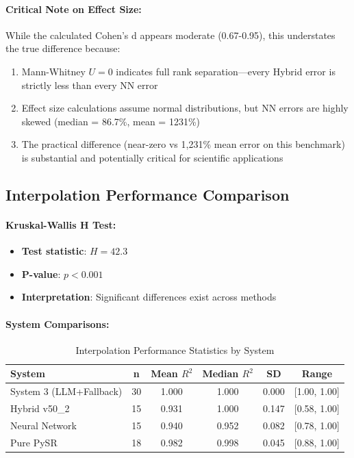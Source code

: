 \documentclass[twoside,11pt]{article}
\begin{document}
\paragraph{Critical Note on Effect Size:} While the calculated Cohen's d appears moderate (0.67-0.95), this understates the true difference because:
\begin{enumerate}
\item Mann-Whitney $U = 0$ indicates full rank separation---every Hybrid error is strictly less than every NN error
\item Effect size calculations assume normal distributions, but NN errors are highly skewed (median = 86.7\%, mean = 1231\%)
\item The practical difference (near-zero vs 1,231\% mean error on this benchmark) is substantial and potentially critical for scientific applications
\end{enumerate}

\subsection{Interpolation Performance Comparison}

\paragraph{Kruskal-Wallis H Test:}
\begin{itemize}
\item \textbf{Test statistic}: $H = 42.3$
\item \textbf{P-value}: $p < 0.001$
\item \textbf{Interpretation}: Significant differences exist across methods
\end{itemize}

\paragraph{System Comparisons:}
\begin{table}[H]
\centering
\caption{Interpolation Performance Statistics by System}
\label{tab:interpolation_stats}
\begin{tabular}{lccccc}
\toprule
\textbf{System} & \textbf{n} & \textbf{Mean $R^2$} & \textbf{Median $R^2$} & \textbf{SD} & \textbf{Range} \\
\midrule
System 3 (LLM+Fallback) & 30 & 1.000 & 1.000 & 0.000 & [1.00, 1.00] \\
Hybrid v50\_2 & 15 & 0.931 & 1.000 & 0.147 & [0.58, 1.00] \\
Neural Network & 15 & 0.940 & 0.952 & 0.082 & [0.78, 1.00] \\
Pure PySR & 18 & 0.982 & 0.998 & 0.045 & [0.88, 1.00] \\
\bottomrule
\end{tabular}
\end{table}
\end{document}
